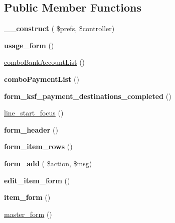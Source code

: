 \subsection*{Public Member Functions}
\begin{DoxyCompactItemize}
\item 
\hypertarget{classksf__payment__destinations__view_aede5c60959361e7283ecd91a2da3aa34}{}\label{classksf__payment__destinations__view_aede5c60959361e7283ecd91a2da3aa34} 
{\bfseries \+\_\+\+\_\+construct} ( \$prefs, \$controller)
\item 
\hypertarget{classksf__payment__destinations__view_a2128245ae36ec5b8c8ebd5650d69c24d}{}\label{classksf__payment__destinations__view_a2128245ae36ec5b8c8ebd5650d69c24d} 
{\bfseries usage\+\_\+form} ()
\item 
\hyperlink{classksf__payment__destinations__view_a9e5a6ab82c58d8f3943888a4755d6ac9}{combo\+Bank\+Account\+List} ()
\item 
\hypertarget{classksf__payment__destinations__view_a5b2f374c808923fd74fd12f84f387664}{}\label{classksf__payment__destinations__view_a5b2f374c808923fd74fd12f84f387664} 
{\bfseries combo\+Payment\+List} ()
\item 
\hypertarget{classksf__payment__destinations__view_ac6b800228e1d26f56009b98fe0e1fc73}{}\label{classksf__payment__destinations__view_ac6b800228e1d26f56009b98fe0e1fc73} 
{\bfseries form\+\_\+ksf\+\_\+payment\+\_\+destinations\+\_\+completed} ()
\item 
\hyperlink{classksf__payment__destinations__view_a5b78ad01dfa787f4445ec711ce929982}{line\+\_\+start\+\_\+focus} ()
\item 
\hypertarget{classksf__payment__destinations__view_a78ebed79bd1632f1cac1aa90b75bef70}{}\label{classksf__payment__destinations__view_a78ebed79bd1632f1cac1aa90b75bef70} 
{\bfseries form\+\_\+header} ()
\item 
\hypertarget{classksf__payment__destinations__view_ac6c5ef63c799f803fe0449136fa38b9a}{}\label{classksf__payment__destinations__view_ac6c5ef63c799f803fe0449136fa38b9a} 
{\bfseries form\+\_\+item\+\_\+rows} ()
\item 
\hypertarget{classksf__payment__destinations__view_aa5109fc69be72be0b97de639496024e9}{}\label{classksf__payment__destinations__view_aa5109fc69be72be0b97de639496024e9} 
{\bfseries form\+\_\+add} ( \$action, \$msg)
\item 
\hypertarget{classksf__payment__destinations__view_a22bdc4f15029d30d8f04c304fc82d549}{}\label{classksf__payment__destinations__view_a22bdc4f15029d30d8f04c304fc82d549} 
{\bfseries edit\+\_\+item\+\_\+form} ()
\item 
\hypertarget{classksf__payment__destinations__view_a2eb480d413a1fc6b8d696b9d85173813}{}\label{classksf__payment__destinations__view_a2eb480d413a1fc6b8d696b9d85173813} 
{\bfseries item\+\_\+form} ()
\item 
\hyperlink{classksf__payment__destinations__view_a803d4b744228624d16222728b9062f74}{master\+\_\+form} ()
\end{DoxyCompactItemize}
